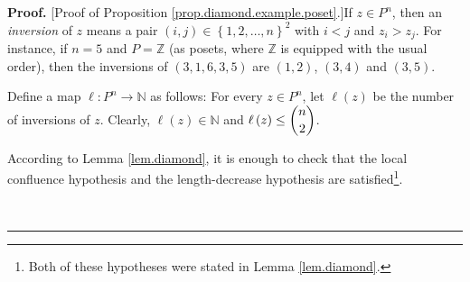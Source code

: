 \documentclass[numbers=enddot,12pt,final,onecolumn,notitlepage]{scrartcl}%
\theoremstyle{definition}
\newenvironment{proof}[1][Proof]{\noindent\textbf{#1.} }{\ \rule{0.5em}{0.5em}}
\begin{document}
\begin{proof}
[Proof of Proposition \ref{prop.diamond.example.poset}.]If $z\in P^{n}$, then
an \textit{inversion} of $z$ means a pair $\left(  i,j\right)  \in\left\{
1,2,\ldots,n\right\}  ^{2}$ with $i<j$ and $z_{i}>z_{j}$. For instance, if
$n=5$ and $P=\mathbb{Z}$ (as posets, where $\mathbb{Z}$ is equipped with the
usual order), then the inversions of $\left(  3,1,6,3,5\right)  $ are $\left(
1,2\right)  $, $\left(  3,4\right)  $ and $\left(  3,5\right)  $.

Define a map $\ell:P^{n}\rightarrow\mathbb{N}$ as follows: For every $z\in
P^{n}$, let $\ell\left(  z\right)  $ be the number of inversions of $z$.
Clearly, $\ell\left(  z\right)  \in\mathbb{N}$ and $\ell\left(  z\right)
\leq\dbinom{n}{2}$.

According to Lemma \ref{lem.diamond}, it is enough to check that the local
confluence hypothesis and the length-decrease hypothesis are
satisfied\footnote{Both of these hypotheses were stated in Lemma
\ref{lem.diamond}.}.


\end{proof}
\end{document}
